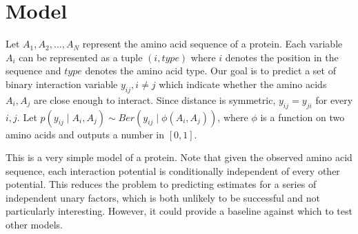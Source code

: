 \documentclass{article}
\begin{document}
\section{Model}
Let $A_1, A_2, \ldots, A_N$ represent the amino acid sequence of a protein. Each variable $A_i$ can be represented as a tuple $(i, type)$ where $i$ denotes the position in the sequence and $type$ denotes the amino acid type. Our goal is to predict a set of binary interaction variable $y_{ij}, i \neq j$ which indicate whether the amino acids $A_i, A_j$ are close enough to interact. Since distance is symmetric, $y_{ij} = y_{ji}$ for every $i, j$. Let $p(y_{ij} \mid A_i, A_j) \sim Ber(y_{ij} \mid \phi(A_i, A_j))$, where $\phi$ is a function on two amino acids and outputs a number in $[0, 1]$. 

%	
%		

This is a very simple model of a protein. Note that given the observed amino acid sequence, each interaction potential is conditionally independent of every other potential. This reduces the problem to predicting estimates for a series of independent unary factors, which is both unlikely to be successful and not particularly interesting. However, it could provide a baseline against which to test other models.
\end{document}
